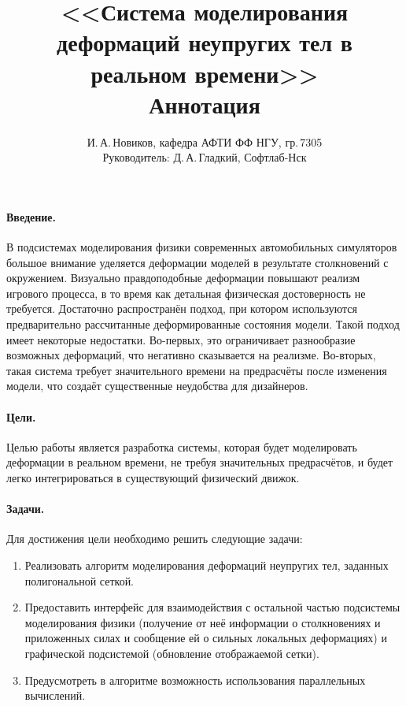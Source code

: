 \documentclass[a4paper,11pt,twocolumn]{article}
\author{И.\,А.\,Новиков, кафедра АФТИ ФФ НГУ, гр.\,7305\\ Руководитель: Д.\,А.\,Гладкий, Софтлаб-Нск}
\title{<<Система моделирования деформаций неупругих тел в реальном времени>>\\ Аннотация}
\begin{document}
  \maketitle
  \thispagestyle{empty}
  \paragraph{Введение.}
    В подсистемах моделирования физики современных автомобильных симуляторов большое внимание
    уделяется деформации моделей в результате столкновений с окружением. Визуально
    правдоподобные деформации повышают реализм игрового процесса, в то время как детальная
    физическая достоверность не требуется. Достаточно распространён подход, при
    котором используются предварительно рассчитанные деформированные состояния модели.
    Такой подход имеет некоторые недостатки.
    Во-первых, это ограничивает разнообразие возможных деформаций, что негативно сказывается на
    реализме.  Во-вторых, такая система требует значительного времени на предрасчёты после изменения
    модели, что создаёт существенные неудобства для дизайнеров.
  \paragraph{Цели.}
    Целью работы является разработка системы, которая будет моделировать деформации в реальном
    времени, не требуя значительных предрасчётов, и будет легко интегрироваться в существующий
    физический движок.
  \paragraph{Задачи.}
    Для достижения цели необходимо решить следующие задачи:
    \begin{enumerate}
      \item Реализовать алгоритм моделирования деформаций неупругих тел, заданных полигональной сеткой.
      \item Предоставить интерфейс для взаимодействия с остальной частью подсистемы моделирования
        физики (получение от неё информации о столкновениях и приложенных силах и сообщение ей о
        сильных локальных деформациях) и графической подсистемой (обновление отображаемой сетки).
      \item Предусмотреть в алгоритме возможность использования параллельных вычислений.
    \end{enumerate}
\end{document}
